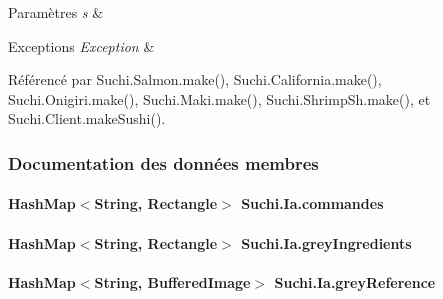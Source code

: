 \begin{DoxyParams}{Paramètres}
{\em s} & \\
\hline
\end{DoxyParams}

\begin{DoxyExceptions}{Exceptions}
{\em Exception} & \\
\hline
\end{DoxyExceptions}


Référencé par Suchi.\+Salmon.\+make(), Suchi.\+California.\+make(), Suchi.\+Onigiri.\+make(), Suchi.\+Maki.\+make(), Suchi.\+Shrimp\+Sh.\+make(), et Suchi.\+Client.\+make\+Sushi().



\subsubsection{Documentation des données membres}
\hypertarget{classSuchi_1_1Ia_a9f2f91d3959433f7607dab851bebf708}{}
\paragraph[{commandes}]{\setlength{\rightskip}{0pt plus 5cm}Hash\+Map$<$String, Rectangle$>$ Suchi.\+Ia.\+commandes\hspace{0.3cm}{\ttfamily [private]}}\label{classSuchi_1_1Ia_a9f2f91d3959433f7607dab851bebf708}
\hypertarget{classSuchi_1_1Ia_a92f2f841b93b2f997c142790d8effaab}{}
\paragraph[{grey\+Ingredients}]{\setlength{\rightskip}{0pt plus 5cm}Hash\+Map$<$String, Rectangle$>$ Suchi.\+Ia.\+grey\+Ingredients\hspace{0.3cm}{\ttfamily [private]}}\label{classSuchi_1_1Ia_a92f2f841b93b2f997c142790d8effaab}
\hypertarget{classSuchi_1_1Ia_ac3454d0cfbe97e4a863a962455f5d5d7}{}
\paragraph[{grey\+Reference}]{\setlength{\rightskip}{0pt plus 5cm}Hash\+Map$<$String, Buffered\+Image$>$ Suchi.\+Ia.\+grey\+Reference\hspace{0.3cm}{\ttfamily [private]}}\label{classSuchi_1_1Ia_ac3454d0cfbe97e4a863a962455f5d5d7}
\hypertarget{classSuchi_1_1Ia_af7ce6cad6d21a47c9c31559657a9f000}{}
